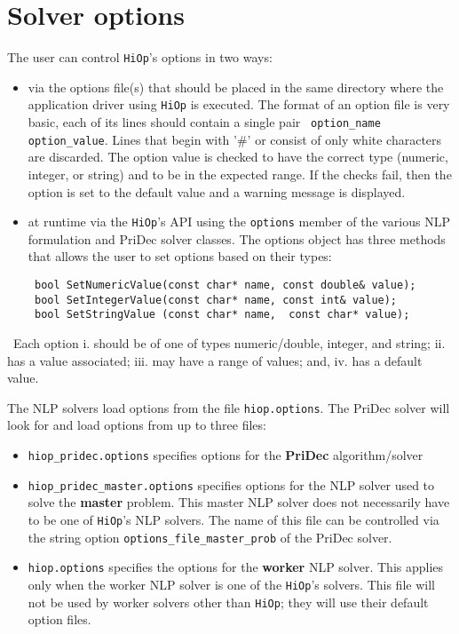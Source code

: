 \documentclass[11pt]{article}
\newcounter{line}
\newcommand{\warningSymbol}{\raisebox{0.9\depth}{\danger}}
\newcommand{\warningcp}[1]{%
        \smallskip \noindent \textcolor{warningColorText}{\warningSymbol{}}\,\textbf{#1} %
    }
\newcommand{\Hi}{\texttt{HiOp}\xspace}
\begin{document}

\section{Solver options}
The user can control \Hi's options in two ways:
\begin{itemize}
\item via the options file(s) that should be placed in the same directory where the application driver using \Hi is executed. The format of an option file is very basic, each of its lines should contain a single pair \texttt{ option\_name option\_value}. Lines that begin with '\#' or consist of only white characters are discarded. The option value is checked to have the correct type (numeric, integer, or string) and to be in the expected range. If the checks fail, then the option is set to the default value and a warning message is displayed.
\item at runtime via the \Hi's API using the \texttt{options} member of the various NLP formulation and PriDec solver classes. The options object has three methods that allows the user to set options based on their types:
\begin{lstlisting}
 bool SetNumericValue(const char* name, const double& value);
 bool SetIntegerValue(const char* name, const int& value);
 bool SetStringValue (const char* name,  const char* value);
\end{lstlisting}
\end{itemize}

\warningcp{} Each option i. should be of one of types numeric/double, integer, and string; ii. has a value associated; iii. may have a range of values;  and, iv. has a default value. 

The NLP solvers load options from the file \texttt{hiop.options}. The PriDec solver will look for and load options from up to three files:
\begin{itemize}
\item \texttt{hiop\_pridec.options} specifies options for the \textbf{PriDec} algorithm/solver
\item \texttt{hiop\_pridec\_master.options} specifies options for the NLP solver used to solve the \textbf{master} problem. This master NLP solver does not necessarily have to be one of \Hi's NLP solvers. The name of this file can be controlled via the string option \texttt{options\_file\_master\_prob} of the PriDec solver.
\item \texttt{hiop.options} specifies the options for the \textbf{worker} NLP solver. This applies only when the worker NLP solver is one of the \Hi's solvers. This file will not be used by worker solvers other than \Hi; they will use their default option files.
\end{itemize}
\end{document}
